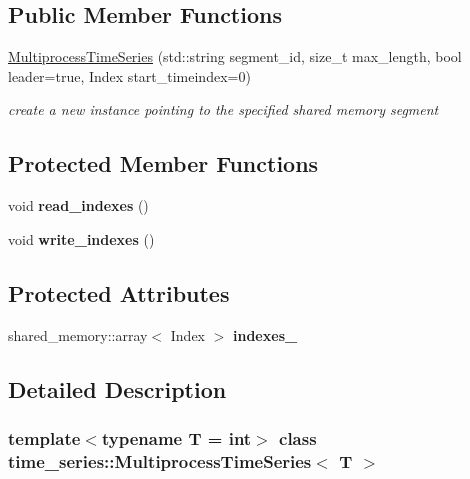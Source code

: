 \subsection*{Public Member Functions}
\begin{DoxyCompactItemize}
\item 
\hyperlink{classtime__series_1_1MultiprocessTimeSeries_a118890497b42365a56221c66edbb478e}{Multiprocess\+Time\+Series} (std\+::string segment\+\_\+id, size\+\_\+t max\+\_\+length, bool leader=true, Index start\+\_\+timeindex=0)
\begin{DoxyCompactList}\small\item\em create a new instance pointing to the specified shared memory segment \end{DoxyCompactList}\end{DoxyCompactItemize}
\subsection*{Protected Member Functions}
\begin{DoxyCompactItemize}
\item 
\mbox{\label{classtime__series_1_1MultiprocessTimeSeries_a44445322f664019684a02caa31639c14}} 
void {\bfseries read\+\_\+indexes} ()
\item 
\mbox{\label{classtime__series_1_1MultiprocessTimeSeries_abc59736f908b8e3f4e6881607e2253a7}} 
void {\bfseries write\+\_\+indexes} ()
\end{DoxyCompactItemize}
\subsection*{Protected Attributes}
\begin{DoxyCompactItemize}
\item 
\mbox{\label{classtime__series_1_1MultiprocessTimeSeries_a0ae05ba33e9f73f839e2229677062518}} 
shared\+\_\+memory\+::array$<$ Index $>$ {\bfseries indexes\+\_\+}
\end{DoxyCompactItemize}


\subsection{Detailed Description}
\subsubsection*{template$<$typename T = int$>$\newline
class time\+\_\+series\+::\+Multiprocess\+Time\+Series$<$ T $>$}

